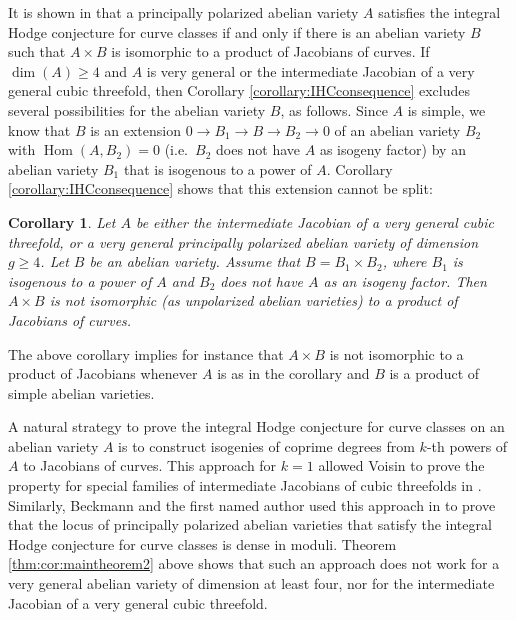 \documentclass[a4paper,11pt,reqno]{amsart}
\numberwithin{equation}{section}
\theoremstyle{plain}
\newtheorem{corollary}[theorem]{Corollary}
\theoremstyle{definition}
\newcommand{\Hom}{\operatorname{Hom}}
\begin{document}
It is shown in \cite{beckmann-degaayfortman,voisin2022cycle} that a principally polarized abelian variety $A$ satisfies the integral Hodge conjecture for curve classes if and only if there is an abelian variety $B$ such that $A\times B$ is isomorphic to a product of Jacobians of curves. If $\dim(A) \geq 4$ and $A$ is very general or the intermediate Jacobian of a very general cubic threefold,  
then Corollary \ref{corollary:IHCconsequence} excludes several possibilities for the abelian variety $B$, as follows.
Since $A$ is simple, we know that $B$ is an extension $0\to B_1\to B\to B_2\to 0$ of an abelian variety $B_2$ with $\Hom(A,B_2)=0$ (i.e.\ $B_2$ does not have $A$ as isogeny factor) by an abelian variety $B_1$ that is isogenous to a power of $A$. 
Corollary \ref{corollary:IHCconsequence} shows that this extension cannot be split: 

\begin{corollary}\label{cor:IHCconsequence-2}
Let $A$ be either the intermediate Jacobian of a very general cubic threefold, or a very general principally polarized abelian variety of dimension $g \geq 4$. 
Let $B$ be an abelian variety.
Assume that $B=B_1\times B_2$, where $B_1$ is isogenous to a power of $A$ and $B_2$ does not have $A$ as an isogeny factor.
Then $A\times B$ is not  isomorphic (as unpolarized abelian varieties) to a product of Jacobians of curves.  
\end{corollary}

The above corollary implies for instance that $A\times B$ is not isomorphic to a product of Jacobians whenever $A$ is as in the corollary and $B$ is a product of simple abelian varieties.

A natural strategy to prove the integral Hodge conjecture for curve classes on an abelian variety $A$ is to construct isogenies of coprime degrees from $k$-th powers of $A$ to Jacobians of curves. 
This approach for $k=1$ allowed Voisin to prove the property for special families of intermediate Jacobians of cubic threefolds in \cite{voisin-universalCHgroup}. 
Similarly, Beckmann and the first named author used this approach in \cite{beckmann-degaayfortman} to prove that the locus of principally polarized abelian varieties that satisfy the integral Hodge conjecture for curve classes is dense in moduli. 
Theorem \ref{thm:cor:maintheorem2} above shows that such an approach does not work for a very general abelian variety of dimension at least four, nor for the intermediate Jacobian of a very general cubic threefold.
\end{document}
